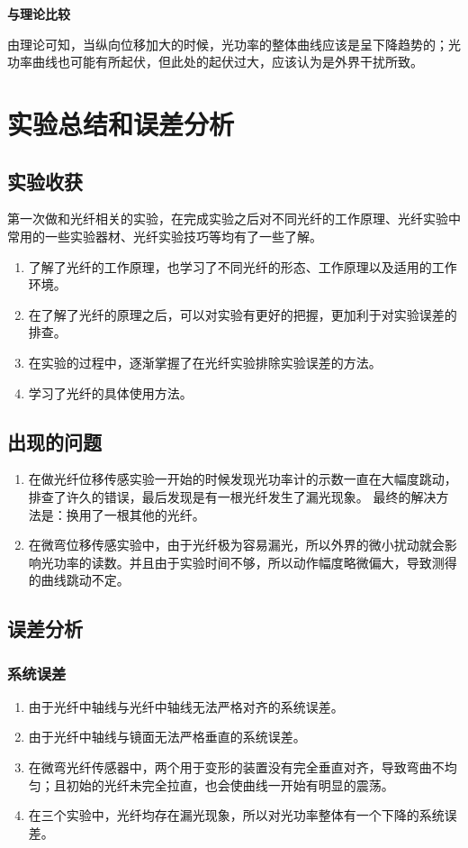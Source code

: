 \documentclass[a4paper,UTF8]{ctexart}
\begin{document}
{\bfseries 与理论比较}

由理论可知，当纵向位移加大的时候，光功率的整体曲线应该是呈下降趋势的；光功率曲线也可能有所起伏，但此处的起伏过大，应该认为是外界干扰所致。

\section{实验总结和误差分析}

\subsection{实验收获}

第一次做和光纤相关的实验，在完成实验之后对不同光纤的工作原理、光纤实验中常用的一些实验器材、光纤实验技巧等均有了一些了解。

\begin{enumerate}
    \item 了解了光纤的工作原理，也学习了不同光纤的形态、工作原理以及适用的工作环境。
    \item 在了解了光纤的原理之后，可以对实验有更好的把握，更加利于对实验误差的排查。
    \item 在实验的过程中，逐渐掌握了在光纤实验排除实验误差的方法。
    \item 学习了光纤的具体使用方法。
\end{enumerate}

\subsection{出现的问题}

\begin{enumerate}
    \item 在做光纤位移传感实验一开始的时候发现光功率计的示数一直在大幅度跳动，排查了许久的错误，最后发现是有一根光纤发生了漏光现象。
    最终的解决方法是：换用了一根其他的光纤。
    \item 在微弯位移传感实验中，由于光纤极为容易漏光，所以外界的微小扰动就会影响光功率的读数。并且由于实验时间不够，所以动作幅度略微偏大，导致测得的曲线跳动不定。
\end{enumerate}

\subsection{误差分析}

\subsubsection{系统误差}

\begin{enumerate}
    \item 由于光纤中轴线与光纤中轴线无法严格对齐的系统误差。
    \item 由于光纤中轴线与镜面无法严格垂直的系统误差。
    \item 在微弯光纤传感器中，两个用于变形的装置没有完全垂直对齐，导致弯曲不均匀；且初始的光纤未完全拉直，也会使曲线一开始有明显的震荡。
    \item 在三个实验中，光纤均存在漏光现象，所以对光功率整体有一个下降的系统误差。
\end{enumerate}
\end{document}
